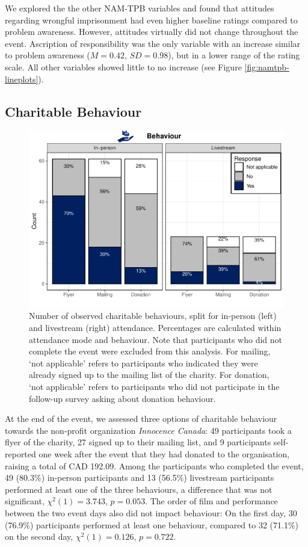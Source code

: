 \documentclass[
  man,floatsintext]{apa6}
\begin{document}
We explored the the other NAM-TPB variables and found that attitudes regarding wrongful imprisonment had even higher baseline ratings compared to problem awareness. However, attitudes virtually did not change throughout the event. Ascription of responsibility was the only variable with an increase similar to problem awareness (\(M = 0.42\), \(SD = 0.98\)), but in a lower range of the rating scale. All other variables showed little to no increase (see Figure \ref{fig:namtpb-lineplots}).

\subsection{Charitable Behaviour}\label{charitable-behaviour}



\begin{figure}
\includegraphics[width=1\linewidth]{Schlichting_MSc_Thesis_files/figure-latex/count-behaviour-1} \caption{Number of observed charitable behaviours, split for in-person (left) and livestream (right) attendance. Percentages are calculated within attendance mode and behaviour. Note that participants who did not complete the event were excluded from this analysis. For mailing, `not applicable' refers to participants who indicated they were already signed up to the mailing list of the charity. For donation, `not applicable' refers to participants who did not participate in the follow-up survey asking about donation behaviour.}\label{fig:count-behaviour}
\end{figure}

At the end of the event, we assessed three options of charitable behaviour towards the non-profit organization \emph{Innocence Canada}: 49 participants took a flyer of the charity, 27 signed up to their mailing list, and 9 participants self-reported one week after the event that they had donated to the organisation, raising a total of CAD 192.09. Among the participants who completed the event, 49 (80.3\%) in-person participants and 13 (56.5\%) livestream participants performed at least one of the three behaviours, a difference that was not significant, \(\chi^2(1) = 3.743\), \(p = 0.053\). The order of film and performance between the two event days also did not impact behaviour: On the first day, 30 (76.9\%) participants performed at least one behaviour, compared to 32 (71.1\%) on the second day, \(\chi^2(1) = 0.126\), \(p = 0.722\).
\end{document}

